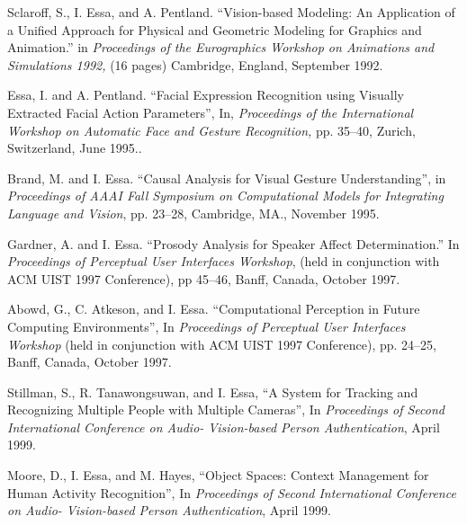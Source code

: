 \begin{pub}

\item Sclaroff, S., I. Essa, and A. Pentland. ``Vision-based Modeling: An
Application of a Unified Approach for Physical and Geometric
Modeling for Graphics and Animation.'' in \textit{Proceedings of
the Eurographics Workshop on Animations and Simulations 1992,} (16
pages) Cambridge, England, September 1992.

\item Essa, I. and A. Pentland. ``Facial Expression Recognition using Visually
Extracted Facial Action Parameters'', In, \textit{Proceedings of
the International Workshop on Automatic Face and Gesture
Recognition,} pp. 35--40, Zurich, Switzerland, June
1995..

\item Brand, M. and I. Essa. ``Causal Analysis for Visual Gesture Understanding'',
in  \textit{Proceedings of AAAI Fall Symposium on Computational
Models for Integrating Language and Vision}, pp. 23--28,
Cambridge, MA., November 1995.

\item Gardner, A. and I. Essa. ``Prosody Analysis for Speaker Affect
Determination.'' In\textit{ Proceedings of Perceptual User
Interfaces Workshop}, (held in conjunction with ACM UIST 1997
Conference), pp 45--46, Banff, Canada, October 1997.
\label{pub:affect-pui97}

\item Abowd, G., C. Atkeson, and I. Essa. ``Computational Perception in Future
Computing Environments'', In \textit{Proceedings of Perceptual
User Interfaces Workshop} (held in conjunction with ACM UIST 1997
Conference), pp. 24--25, Banff, Canada, October 1997.

\item Stillman, S., R. Tanawongsuwan, and I. Essa, ``A System for Tracking and
Recognizing Multiple People with Multiple Cameras'', In
\textit{Proceedings of Second International Conference on Audio-
Vision-based Person Authentication}, April 1999.
\label{pub:tracking-avbpa99}

\item Moore, D., I. Essa, and M. Hayes, ``Object Spaces: Context Management for
Human Activity Recognition'', In \textit{Proceedings of Second
International Conference on Audio- Vision-based Person
Authentication}, April 1999.
\label{pub:actions-avbpa99}


\end{pub}
